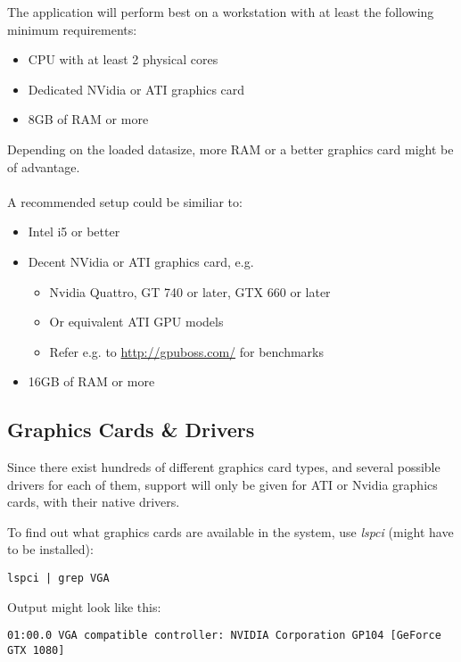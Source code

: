 The application will perform best on a workstation with at least the following minimum requirements:

\begin{itemize}  
\item CPU with at least 2 physical cores
\item Dedicated NVidia or ATI graphics card
\item 8GB of RAM or more
\end{itemize}

Depending on the loaded datasize, more RAM or a better graphics card might be of advantage. \\\\

A recommended setup could be similiar to:

\begin{itemize}  
\item Intel i5 or better
\item Decent NVidia or ATI graphics card, e.g.
\begin{itemize}  
\item Nvidia Quattro, GT 740 or later, GTX 660 or later
\item Or equivalent ATI GPU models
\item Refer e.g. to \url{http://gpuboss.com/} for benchmarks
\end{itemize}
\item 16GB of RAM or more
\end{itemize}

\subsection{Graphics Cards \& Drivers}
\label{sec:graphics_installation}

Since there exist hundreds of different graphics card types, and several possible drivers for each of them, support will only be given for ATI or Nvidia graphics cards, with their native drivers.

To find out what graphics cards are available in the system, use \textit{lspci} (might have to be installed):

\begin{verbatim}
lspci | grep VGA
\end{verbatim}

Output might look like this:

\begin{verbatim}
01:00.0 VGA compatible controller: NVIDIA Corporation GP104 [GeForce GTX 1080]
\end{verbatim}

